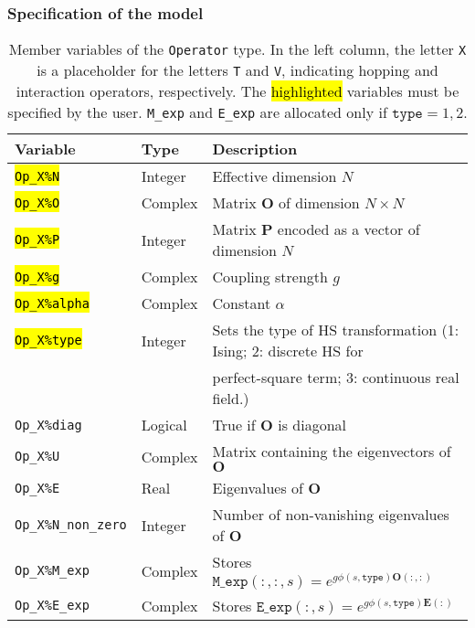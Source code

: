 \subsubsection{Specification of the model}\label{sec:specific}
%
\begin{table}[h]
    \begin{tabular}{@{} l l l @{}}\toprule
    Variable & Type & Description \\\midrule
    \hl{\texttt{Op\_X\%N}}       & Integer     &  Effective dimension $N$ \\
    \hl{\texttt{Op\_X\%O}}       & Complex    &  Matrix  $\bm{O}$  of dimension $N \times N$\\
    \hl{\texttt{Op\_X\%P}}       & Integer   &  Matrix $\bm{P}$  encoded as a vector of dimension $N$\\
    \hl{\texttt{Op\_X\%g}}       & Complex    &  Coupling strength $g$ \\  
    \hl{\texttt{Op\_X\%alpha}}   & Complex  &  Constant $\alpha$ \\
    \hl{\texttt{Op\_X\%type}}    & Integer   &  Sets the type of HS transformation (1: Ising; 2: discrete HS for\\
             &   &   perfect-square term; 3: continuous real field.)  \\ 
    \texttt{Op\_X\%diag}  & Logical & True if   $\bm{O}$  is  diagonal  \\
    \texttt{Op\_X\%U}            & Complex &  Matrix containing the eigenvectors of $\bm{O}$  \\
    \texttt{Op\_X\%E}            & Real &  Eigenvalues of $\bm{O}$ \\
    \texttt{Op\_X\%N\_non\_zero} & Integer &  Number of non-vanishing eigenvalues of $\bm{O}$  \\
    \texttt{Op\_X\%M\_exp}    & Complex &  Stores $ \texttt{M\_exp}(:,:,s) = e^{g  \phi(s,\texttt{type}) \bm{O}(:,:)} $  \\
    \texttt{Op\_X\%E\_exp}    & Complex &  Stores $ \texttt{E\_exp}(:,s) = e^{g  \phi(s,\texttt{type}) \bm{E}(:)} $ 
     \\\bottomrule
   \end{tabular}
   \caption{Member variables of the \texttt{Operator}  type. 
   In the left column, the letter \texttt{X} is a placeholder for the letters \texttt{T} and \texttt{V}, 
   indicating hopping and interaction operators, respectively.
   The \hl{highlighted} variables must be specified by the user. \texttt{M\_exp} and \texttt{E\_exp}  are allocated only if  $\texttt{type}=1,2$. 
    \label{table:operator}}
\end{table}
%

